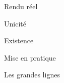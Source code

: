 \begin{frame-gene}{Rendu réel}
	\small

	\begin{theorem}[Important]
    	\fakecontent
	\end{theorem}

	\begin{demo}{Unicité}
    	\fakecontent
	\end{demo}

	\begin{demo}{Existence}
    	\fakecontent
	\end{demo}
	
	\begin{exercice*}{Mise en pratique}
    	\fakecontent
	\end{exercice*}

	\begin{solution*}{Les grandes lignes}
    	\fakecontent
	\end{solution*}

	\begin{example}
	    \fakecontent
	\end{example}

	\demotodo
\end{frame-gene}
